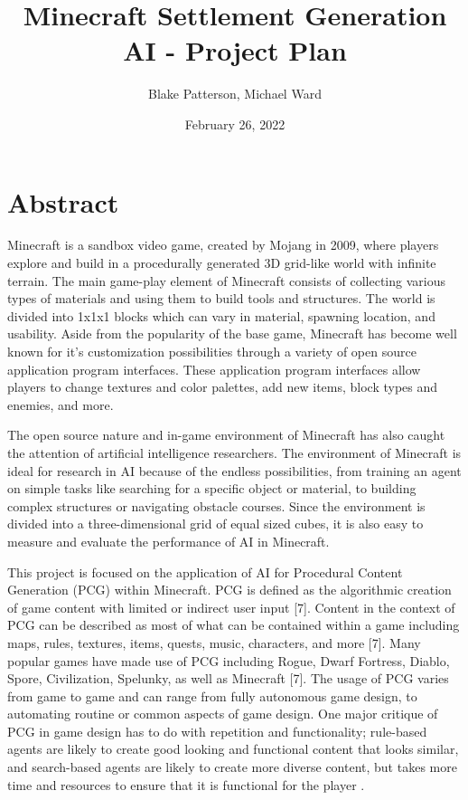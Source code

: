 \documentclass[11pt, oneside]{article}
\begin{document}
\title{Minecraft Settlement Generation AI - Project Plan}
\author{Blake Patterson, Michael Ward}
\date{February 26, 2022}
\maketitle

\newpage
\tableofcontents
\newpage
{}


\section{Abstract}
\label{abstract}

\begin{normalsize}

	Minecraft is a sandbox video game, created by Mojang in 2009, where players explore and build in a procedurally generated 3D grid-like world with infinite terrain. The main game-play element of Minecraft consists of collecting various types of materials and using them to build tools and structures. The world is divided into 1x1x1 blocks which can vary in material, spawning location, and usability. Aside from the popularity of the base game, Minecraft has become well known for it's customization possibilities through a variety of open source application program interfaces. These application program interfaces allow players to change textures and color palettes, add new items, block types and enemies, and more. 

The open source nature and in-game environment of Minecraft has also caught the attention of artificial intelligence researchers. The environment of Minecraft is ideal for research in AI because of the endless possibilities, from training an agent on simple tasks like searching for a specific object or material, to building complex structures or navigating obstacle courses. Since the environment is divided into a three-dimensional grid of equal sized cubes, it is also easy to measure and evaluate the performance of AI in Minecraft.

This project is focused on the application of AI for Procedural Content Generation (PCG) within Minecraft. PCG is defined as the algorithmic creation of game content with limited or indirect user input [7]. Content in the context of PCG can be described as most of what can be contained within a game including maps, rules, textures, items, quests, music, characters, and more [7]. Many popular games have made use of PCG including Rogue, Dwarf Fortress, Diablo, Spore, Civilization, Spelunky, as well as Minecraft [7]. The usage of PCG varies from game to game and can range from fully autonomous game design, to  automating routine or common aspects of game design. One major critique of PCG in game design has to do with repetition and functionality; rule-based agents are likely to create good looking and functional content that looks similar, and search-based agents are likely to create more diverse content, but takes more time and resources to ensure that it is functional for the player \cite{green_organic_2019}.


\end{normalsize}
\end{document}
